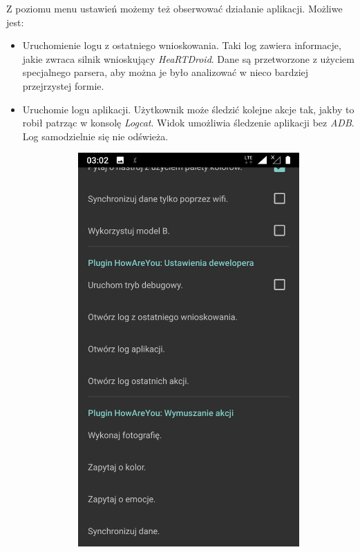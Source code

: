 Z poziomu menu ustawień możemy też obserwować działanie aplikacji. Możliwe jest:

\begin{itemize}
	\item Uruchomienie logu z ostatniego wnioskowania. Taki log zawiera informacje, jakie zwraca silnik wnioskujący \textit{HeaRTDroid}. Dane są przetworzone z użyciem specjalnego parsera, aby można je było analizować w nieco bardziej przejrzystej formie.
	
	\item Uruchomie logu aplikacji. Użytkownik może śledzić kolejne akcje tak, jakby to robił patrząc w konsolę \textit{Logcat}. Widok umożliwia śledzenie aplikacji bez \textit{ADB}. Log samodzielnie się nie odświeża.
	
	\begin{figure}[H]
		\centering
		\begin{subfigure}{0.35\textwidth}
			\centering
			\includegraphics[scale=0.13]{rozdzial3/Ustawienia_cz2.png}

\end{subfigure}
\end{figure}
\end{itemize}
